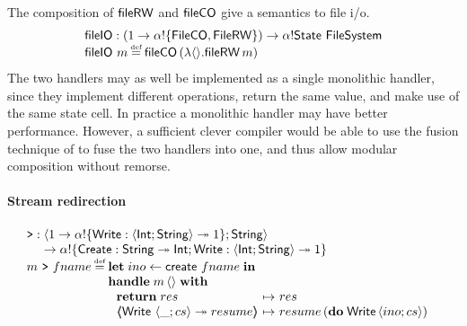 \documentclass[12pt,phd,lfcs,twoside,openright,logo,leftchapter,normalheadings]{infthesis}
\theoremstyle{plain}
\theoremstyle{definition}
\begin{document}
The composition of $\mathsf{fileRW}$ and $\mathsf{fileCO}$ give a semantics to file
i/o.
%
\[
  \bl
    \fileIO : (\UnitType \to \alpha \eff \{\dec{FileCO},\dec{FileRW}\}) \to \alpha \eff \State~\FileSystem \\
    \fileIO~m \defas \dec{fileCO}\,(\lambda\Unit. \dec{fileRW}\,m)
  \el
\]
%
The two handlers may as well be implemented as a single monolithic
handler, since they implement different operations, return the same
value, and make use of the same state cell. In practice a monolithic
handler may have better performance. However, a sufficient clever
compiler would be able to use the fusion technique of \citet{WuS15} to
fuse the two handlers into one, and thus allow modular composition
without remorse.

\paragraph{Stream redirection}
%
%
\[
  \bl
  \redirect :
     \bl
       \Record{\UnitType \to \alpha \eff \{\Write : \Record{\Int;\String} \opto \UnitType\}; \String}\\
       \to \alpha \eff \{\UCreate : \String \opto \Int;\Write : \Record{\Int;\String} \opto \UnitType\}
     \el\\
    m~\redirect~fname \defas
        \ba[t]{@{}l}
          \Let\;ino \revto \Ucreate~fname\;\In\\
          \Handle\;m\,\Unit\;\With\\
             ~\ba{@{~}l@{~}c@{~}l}
                 \Return\;res      &\mapsto& res\\
                 \OpCase{\Write}{\Record{\_;cs}}{resume} &\mapsto& resume\,(\Do\;\Write\,\Record{ino;cs})
               \ea
         \ea
  \el
\]
%
\medskip\\
\end{document}
